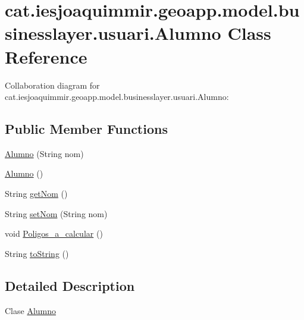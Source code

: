 \hypertarget{classcat_1_1iesjoaquimmir_1_1geoapp_1_1model_1_1businesslayer_1_1usuari_1_1_alumno}{}\section{cat.\+iesjoaquimmir.\+geoapp.\+model.\+businesslayer.\+usuari.\+Alumno Class Reference}
\label{classcat_1_1iesjoaquimmir_1_1geoapp_1_1model_1_1businesslayer_1_1usuari_1_1_alumno}


Collaboration diagram for cat.\+iesjoaquimmir.\+geoapp.\+model.\+businesslayer.\+usuari.\+Alumno\+:
\subsection*{Public Member Functions}
\begin{DoxyCompactItemize}
\item 
\mbox{\hyperlink{classcat_1_1iesjoaquimmir_1_1geoapp_1_1model_1_1businesslayer_1_1usuari_1_1_alumno_ae76abed820f1b368313c95e1b7033900}{Alumno}} (String nom)
\item 
\mbox{\hyperlink{classcat_1_1iesjoaquimmir_1_1geoapp_1_1model_1_1businesslayer_1_1usuari_1_1_alumno_a4e97918bfc9201fda850a5453e95891c}{Alumno}} ()
\item 
String \mbox{\hyperlink{classcat_1_1iesjoaquimmir_1_1geoapp_1_1model_1_1businesslayer_1_1usuari_1_1_alumno_ab816f16cde0078cd1fd3f10c1739d6a7}{get\+Nom}} ()
\item 
String \mbox{\hyperlink{classcat_1_1iesjoaquimmir_1_1geoapp_1_1model_1_1businesslayer_1_1usuari_1_1_alumno_a93758a66be1d1474e4c20d4c794059f3}{set\+Nom}} (String nom)
\item 
void \mbox{\hyperlink{classcat_1_1iesjoaquimmir_1_1geoapp_1_1model_1_1businesslayer_1_1usuari_1_1_alumno_aadc2fd0383159881fec5889eb702d734}{Poligos\+\_\+a\+\_\+calcular}} ()
\item 
String \mbox{\hyperlink{classcat_1_1iesjoaquimmir_1_1geoapp_1_1model_1_1businesslayer_1_1usuari_1_1_alumno_a8a7b2d51540e2d88956f3dc2a41bafde}{to\+String}} ()
\end{DoxyCompactItemize}


\subsection{Detailed Description}
Clase \mbox{\hyperlink{classcat_1_1iesjoaquimmir_1_1geoapp_1_1model_1_1businesslayer_1_1usuari_1_1_alumno}{Alumno}}

